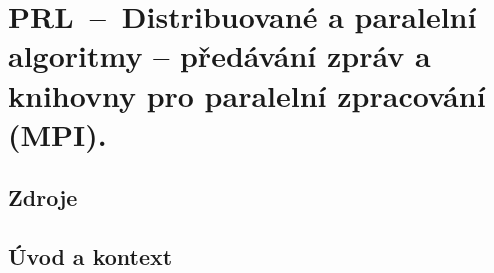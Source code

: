 

\graphicspath{{prl/paralelni_algoritmy_predavani_zprav/figures}}


\chapter{PRL~--~Distribuované a paralelní algoritmy -- předávání zpráv a knihovny pro paralelní zpracování (MPI).}


\section{Zdroje}

\begin{compactitem}
    \item {}
\end{compactitem}


\section{Úvod a kontext}

\begin{compactitem}
    \item {}
\end{compactitem}
